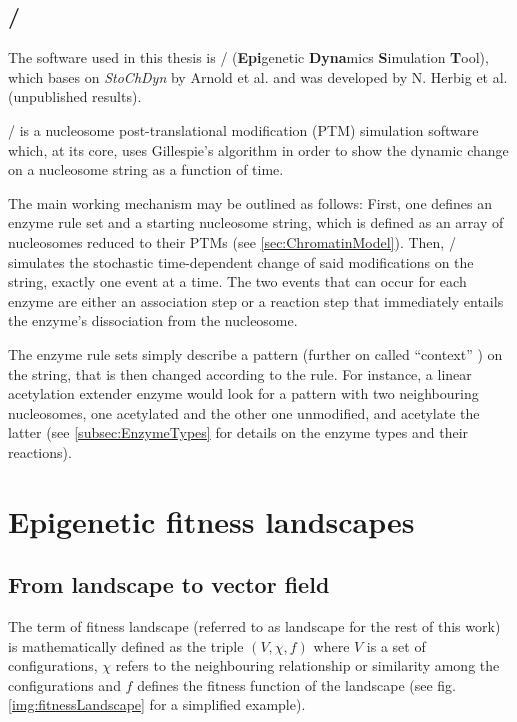         \subsection{\ed/}
        \label{subsec:EpiDynast}
            The software used in this thesis is \ed/ (\textbf{Epi}genetic \textbf{Dyna}mics \textbf{S}imulation \textbf{T}ool), which bases on \textit{StoChDyn} by Arnold et al. \cite{arnold2013chromatin} and was developed by N. Herbig et al. (unpublished results).

            \ed/ is a nucleosome post-translational modification (PTM) simulation software which, at its core, uses Gillespie's algorithm in order to show the dynamic change on a nucleosome string as a function of time.

            The main working mechanism may be outlined as follows: First, one defines an enzyme rule set and a starting nucleosome string, which is defined as an array of nucleosomes reduced to their PTMs (see \ref{sec:ChromatinModel}). Then, \ed/ simulates the stochastic time-dependent change of said modifications on the string, exactly one event at a time. The two events that can occur for each enzyme are either an association step or a reaction step that immediately entails the enzyme's dissociation from the nucleosome.

            The enzyme rule sets simply describe a pattern (further on called “context” %
            ) on the string, that is then changed according to the rule. For instance, a linear acetylation extender enzyme would look for a pattern with two neighbouring nucleosomes, one acetylated and the other one unmodified, and acetylate the latter (see \ref{subsec:EnzymeTypes} for details on the enzyme types and their reactions).

    \section{Epigenetic fitness landscapes} %
        \subsection{From landscape to vector field}
            The term of fitness landscape (referred to as landscape for the rest of this work) is mathematically defined as the triple $(V, \chi, f)$ where $V$ is a set of configurations, $\chi$ refers to the neighbouring relationship or similarity among the configurations and $f$ defines the fitness function of the landscape \cite{Stadler2002} (see fig. \ref{img:fitnessLandscape} for a simplified example).


